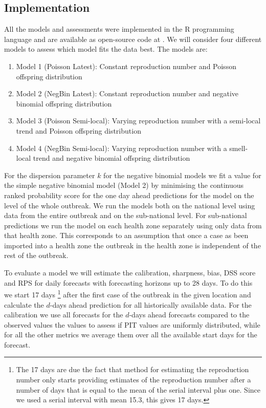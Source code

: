 \documentclass[12pt]{article}
\begin{document}
\subsection{Implementation}
All the models and assessments were implemented in the R programming language \cite{rcoreteamLanguageEnvironmentStatistical2018} and are available as open-source code at \cite{GulfaMscEbola}. We will consider four different models to assess which model fits the data best. The models are:

\begin{enumerate}
\item{Model 1 (Poisson Latest): Constant reproduction number and Poisson offspring distribution}
\item{Model 2 (NegBin Latest): Constant reproduction number and negative binomial offspring distribution}
\item{Model 3 (Poisson Semi-local): Varying reproduction number with a semi-local trend and Poisson offspring distribution}
\item{Model 4 (NegBin Semi-local): Varying reproduction number with a smell-local trend and negative binomial offspring distribution}
\end{enumerate}

For the dispersion parameter $k$ for the negative binomial models we fit a value for the simple negative binomial model (Model 2) by minimising the continuous ranked probability score for the one day ahead predictions for the model on the level of the whole outbreak. We run the models both on the national level using data from the entire outbreak and on the sub-national level. For sub-national predictions we run the model on each health zone separately using only data from that health zone. This corresponds to an assumption that once a case as been imported into a health zone the outbreak in the health zone is independent of the rest of the outbreak.

To evaluate a model we will estimate the calibration, sharpness, bias, DSS score and RPS for daily forecasts with forecasting horizons up to 28 days. To do this we start 17 days \footnote{The 17 days are due the fact that method for estimating the reproduction number only starts providing estimates of the reproduction number after a number of days that is equal to the mean of the serial interval plus one. Since we used a serial interval with mean 15.3, this gives 17 days.} after the first case of the outbreak in the given location and calculate the $d$-days ahead prediction for all historically available data. For the calibration we use all forecasts for the $d$-days ahead forecasts compared to the observed values the values to assess if PIT values are uniformly distributed, while for all the other metrics we average them over all the available start days for the forecast.
\end{document}
